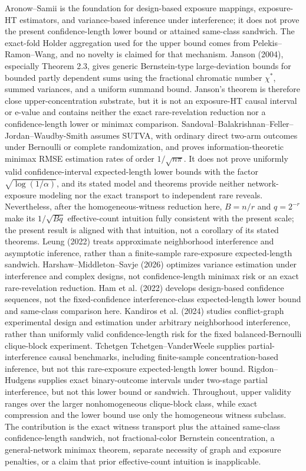 \documentclass{article}
\begin{document}
Aronow--Samii is the foundation for design-based exposure mappings, exposure-HT estimators, and variance-based inference under interference; it does not prove the present confidence-length lower bound or attained same-class sandwich. The exact-fold Holder aggregation used for the upper bound comes from Pelekis--Ramon--Wang, and no novelty is claimed for that mechanism. Janson (2004), especially Theorem 2.3, gives generic Bernstein-type large-deviation bounds for bounded partly dependent sums using the fractional chromatic number \(\chi^*\), summed variances, and a uniform summand bound. Janson's theorem is therefore close upper-concentration substrate, but it is not an exposure-HT causal interval or e-value and contains neither the exact rare-revelation reduction nor a confidence-length lower or minimax comparison. Sandoval--Balakrishnan--Feller--Jordan--Waudby-Smith assumes SUTVA, with ordinary direct two-arm outcomes under Bernoulli or complete randomization, and proves information-theoretic minimax RMSE estimation rates of order \(1/\sqrt{n\pi}\). It does not prove uniformly valid confidence-interval expected-length lower bounds with the factor \(\sqrt{\log(1/\alpha)}\), and its stated model and theorems provide neither network-exposure modeling nor the exact transport to independent rare reveals. Nevertheless, after the homogeneous-witness reduction here, \(B=n/r\) and \(q=2^{-r}\) make its \(1/\sqrt{Bq}\) effective-count intuition fully consistent with the present scale; the present result is aligned with that intuition, not a corollary of its stated theorems. Leung (2022) treats approximate neighborhood interference and asymptotic inference, rather than a finite-sample rare-exposure expected-length sandwich. Harshaw--Middleton--Savje (2026) optimizes variance estimation under interference and complex designs, not confidence-length minimax risk or an exact rare-revelation reduction. Ham et al. (2022) develops design-based confidence sequences, not the fixed-confidence interference-class expected-length lower bound and same-class comparison here. Kandiros et al. (2024) studies conflict-graph experimental design and estimation under arbitrary neighborhood interference, rather than uniformly valid confidence-length risk for the fixed balanced-Bernoulli clique-block experiment. Tchetgen Tchetgen--VanderWeele supplies partial-interference causal benchmarks, including finite-sample concentration-based inference, but not this rare-exposure expected-length lower bound. Rigdon--Hudgens supplies exact binary-outcome intervals under two-stage partial interference, but not this lower bound or sandwich. Throughout, upper validity ranges over the larger nonhomogeneous clique-block class, while exact compression and the lower bound use only the homogeneous witness subclass. The contribution is the exact witness transport plus the attained same-class confidence-length sandwich, not fractional-color Bernstein concentration, a general-network minimax theorem, separate necessity of graph and exposure penalties, or a claim that prior effective-count intuition is inapplicable.
\end{document}
